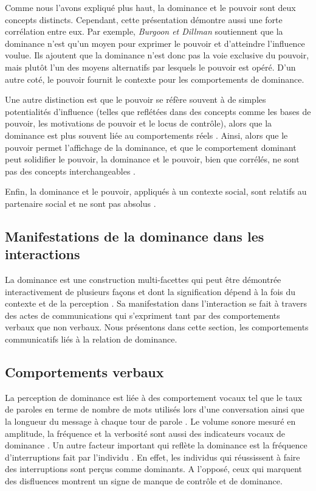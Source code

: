		Comme nous l'avons expliqué plus haut, la dominance et le pouvoir sont deux concepts distincts. Cependant, cette présentation démontre aussi une forte corrélation entre eux. 
		Par exemple, \emph{Burgoon et Dillman} \cite{burgoon1995interpersonal} soutiennent que la dominance n'est qu'un moyen pour exprimer le pouvoir et d'atteindre l'influence voulue.
		Ils ajoutent que la dominance n'est donc pas la voie exclusive du pouvoir, mais plutôt l'un des moyens alternatifs par lesquels le pouvoir est opéré. D'un autre coté, le pouvoir fournit le contexte pour les comportements de dominance. %
		
		Une autre distinction est que le pouvoir se réfère souvent à de simples potentialités d'influence (telles que reflétées dans des concepts comme les bases de pouvoir, les motivations de pouvoir et le locus de contrôle),
		alors que la dominance est plus souvent liée au comportements réels \cite{dunbar2005perceptions,burgoon1998nature}. 
		Ainsi, alors que le pouvoir permet l'affichage de la dominance, et que le comportement dominant peut solidifier le pouvoir, la dominance et le pouvoir, bien que corrélés, ne sont pas des concepts interchangeables \cite{burgoon1995interpersonal}.
		
		Enfin, la dominance et le pouvoir, appliqués à un contexte social, sont relatifs au partenaire social et ne sont pas absolus \cite{dunbar2005perceptions}.
		

		
	\subsection{Manifestations de la dominance dans les interactions}
	\label{sec:manifesationDom}
		La dominance est une construction multi-facettes qui peut être démontrée interactivement de plusieurs façons et dont la signification dépend à la fois du contexte et de la perception \cite{dunbar2005perceptions}. Sa manifestation dans l'interaction se fait à travers des actes de communications qui s'expriment tant par des comportements verbaux que non verbaux.
		Nous présentons dans cette section, les comportements communicatifs liés à la relation de dominance. 
		
		\subsection{Comportements verbaux}
			La perception de dominance est liée à des comportement vocaux tel que le taux de paroles en terme de nombre de mots utilisés lors d'une conversation ainsi que la longueur du message à chaque tour de parole \cite{dunbar2005perceptions}. Le volume sonore mesuré en amplitude, la fréquence et la verbosité sont aussi des indicateurs vocaux de dominance \cite{dunbar2005perceptions}. 
			Un autre facteur important qui reflète la dominance est la fréquence d'interruptions fait par l'individu \cite{dunbar2005perceptions,hall2005nonverbal}. En effet, les individus qui réussissent à faire des interruptions sont perçus comme dominants. A l'opposé, ceux qui marquent des disfluences montrent un signe de manque de contrôle et de dominance. 

